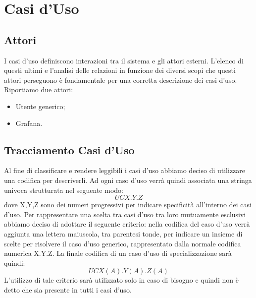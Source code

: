 \section{Casi d'Uso}
		\subsection{Attori}
			I casi d'uso definiscono interazioni tra il sistema e gli attori esterni. L'elenco di questi ultimi e l'analisi delle relazioni in funzione dei diversi scopi che questi attori perseguono è fondamentale per una corretta descrizione dei casi d'uso.
        Riportiamo due attori:
        \begin{itemize}
            \item Utente generico;
            \item Grafana.
        \end{itemize}

		\subsection{Tracciamento Casi d'Uso}
        Al fine di classificare e rendere leggibili i casi d'uso abbiamo deciso di utilizzare una codifica per descriverli. Ad ogni caso d'uso verrà quindi associata una stringa univoca strutturata nel seguente modo:
        \begin{equation}
            UCX.Y.Z    
        \end{equation}
        dove X,Y,Z sono dei numeri progressivi per indicare specificità all'interno dei casi d'uso. \newline
        \newline
        Per rappresentare una scelta tra casi d'uso tra loro mutuamente esclusivi abbiamo deciso di adottare il seguente criterio: nella codifica del caso d'uso verrà aggiunta una lettera maiuscola, tra parentesi tonde, per indicare un insieme di scelte per risolvere il caso d'uso generico, rappresentato dalla normale codifica numerica X.Y.Z. La finale codifica di un caso d'uso di specializzazione sarà quindi:
        \begin{equation}
            UCX(A).Y(A).Z(A)
        \end{equation}
        L'utilizzo di tale criterio sarà utilizzato solo in caso di bisogno e quindi non è detto che sia presente in tutti i casi d'uso.
        
